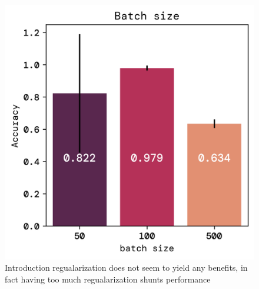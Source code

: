 \documentclass[twoside,11pt]{report}
\begin{document}
\begin{figure}[!ht]
\begin{minipage}[t]{0.5\textwidth - 1mm}
\begin{center}
                \includegraphics[width=\textwidth]{../runsAndFigures/accuracy_batch.png}
            \end{center}
            \caption{Introduction regualarization does not seem to yield any benefits, in fact
            having too much regualarization shunts performance}\label{fig:accuracy_aplha}
        \end{minipage}
    \end{figure}
\end{document}
